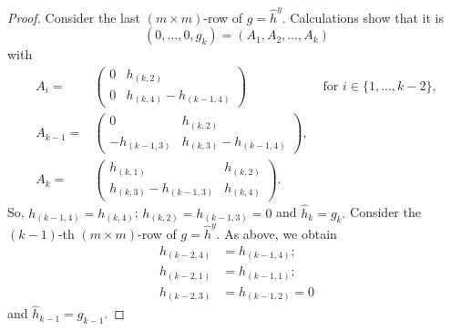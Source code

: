 \begin{proof}
Consider the last $(m \times m)$-row of $g=\hat{h}^y.$ Calculations show that it is $$(0, \ldots, 0, g_k)=(A_1, A_2, \ldots, A_k)$$ with 
{\small
\begin{equation*}
\begin{aligned}
A_i= & \begin{pmatrix} 0 & h_{(k,2)} \\ 0& h_{(k,4)}-h_{(k-1,4)} \end{pmatrix} & \text{ for } i \in \{1, \ldots, k-2\}, \\
 A_{k-1}= &  
 \begin{pmatrix} 0 & h_{(k,2)} \\ -h_{(k-1,3)}& h_{(k,3)}-h_{(k-1,4)} \end{pmatrix},& \\
 A_k = & \begin{pmatrix} h_{(k,1)} & h_{(k,2)} \\ h_{(k,3)}-h_{(k-1,3)}& h_{(k,4)} \end{pmatrix}.&
\end{aligned}
\end{equation*}
}
 So, $h_{(k-1,4)}=h_{(k,4)}$; $h_{(k,2)}=h_{(k-1,3)}=0$ and $\hat{h}_k=g_k.$
Consider the $(k-1)$-th $(m \times m)$-row of $g=\hat{h}^y.$ As above, we obtain
\begin{align*} h_{(k-2,4)}&=h_{(k-1,4)};\\ h_{(k-2,1)}&=h_{(k-1,1)};\\ h_{(k-2,3)}&=h_{(k-1,2)}=0
\end{align*} and $\hat{h}_{k-1}=g_{k-1}.$


\end{proof}
